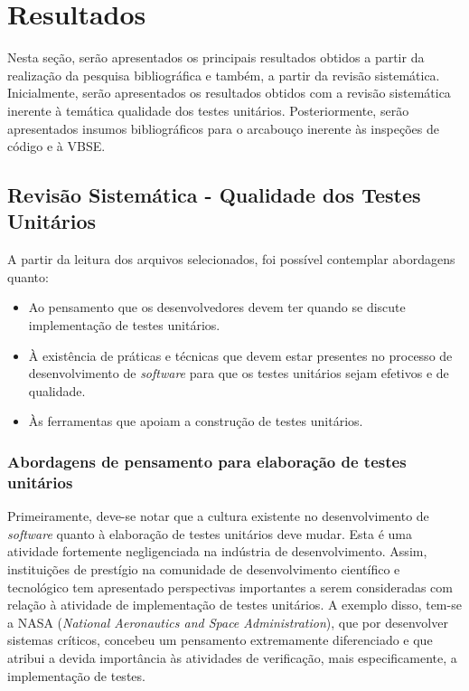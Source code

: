 \chapter{Resultados}

Nesta seção, serão apresentados os principais resultados obtidos a partir da realização da pesquisa bibliográfica e também, a partir da revisão sistemática. Inicialmente, serão apresentados os resultados obtidos com a revisão sistemática inerente à temática qualidade dos testes unitários. Posteriormente, serão apresentados insumos bibliográficos para o arcabouço inerente às inspeções de código e à VBSE.

\section{Revisão Sistemática - Qualidade dos Testes Unitários}

A partir da leitura dos arquivos selecionados, foi possível contemplar abordagens quanto:

\begin{itemize}
	\item Ao pensamento que os desenvolvedores devem ter quando se discute implementação de testes unitários.
	\item À existência de práticas e técnicas que devem estar presentes no processo de desenvolvimento de \textit{software} para que os testes unitários sejam efetivos e de qualidade.
	\item Às ferramentas que apoiam a construção de testes unitários.
\end{itemize}

\subsection{Abordagens de pensamento para elaboração de testes unitários}

Primeiramente, deve-se notar que a cultura existente no desenvolvimento de \textit{software} quanto à elaboração de testes unitários deve mudar. Esta é uma atividade fortemente negligenciada na indústria de desenvolvimento. Assim, instituições de prestígio na comunidade de desenvolvimento científico e tecnológico tem apresentado perspectivas importantes a serem consideradas com relação à atividade de implementação de testes unitários. A exemplo disso, tem-se a NASA (\textit{National Aeronautics and Space Administration}), que por desenvolver sistemas críticos, concebeu um pensamento extremamente diferenciado e que atribui a devida importância às atividades de verificação, mais especificamente, a implementação de testes.

